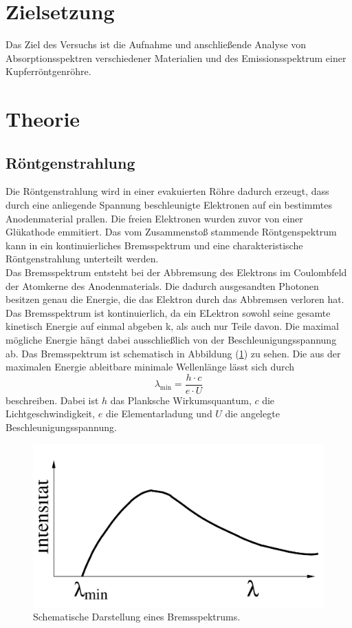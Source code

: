 \section{Zielsetzung}
\label{sec:Zielsetzung}
Das Ziel des Versuchs ist die Aufnahme und anschließende Analyse von Absorptionsspektren verschiedener Materialien und des Emissionsspektrum einer 
Kupferröntgenröhre.
\section{Theorie}
\label{sec:Theorie}
\subsection{Röntgenstrahlung}
Die Röntgenstrahlung wird in einer evakuierten Röhre dadurch erzeugt, dass durch eine anliegende Spannung beschleunigte Elektronen auf ein bestimmtes Anodenmaterial prallen. Die freien Elektronen
wurden zuvor von einer Glükathode emmitiert. Das vom Zusammenstoß stammende Röntgenspektrum kann in ein kontinuierliches Bremsspektrum und eine charakteristische 
Röntgenstrahlung unterteilt werden. \\
Das Bremsspektrum entsteht bei der Abbremsung des Elektrons im Coulombfeld der Atomkerne des Anodenmaterials. Die dadurch ausgesandten Photonen besitzen genau die 
Energie, die das Elektron durch das Abbremsen verloren hat. Das Bremsspektrum ist kontinuierlich, da ein ELektron sowohl seine gesamte kinetisch Energie auf einmal abgeben
k, als auch nur Teile davon. Die maximal mögliche Energie hängt dabei ausschließlich von der Beschleunigungsspannung ab. Das Bremsspektrum ist 
schematisch in Abbildung (\ref{fig:Bremsspektrum}) zu sehen. Die aus der maximalen Energie ableitbare minimale Wellenlänge lässt
sich durch 
\begin{equation}
    \lambda_{\text{min}} = \frac{h \cdot c}{e \cdot U}
    \label{eqn:lambda}
\end{equation}
beschreiben. Dabei ist $h$ das Planksche Wirkumsquantum, $c$ die Lichtgeschwindigkeit, $e$ die Elementarladung und $U$ die angelegte Beschleunigungsspannung.\\
\begin{figure}[H]
    \centering
    \includegraphics[width=\textwidth/2]{content/Bilder/Bremsspektrum.jpeg}
    \caption{Schematische Darstellung eines Bremsspektrums.}
    \label{fig:Bremsspektrum}
\end{figure}

